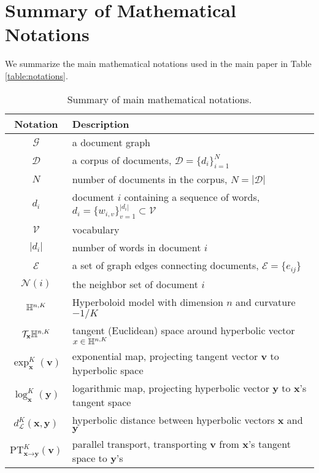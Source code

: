 \section{Summary of Mathematical Notations}
\label{sec:notations}

We summarize the main mathematical notations used in the main paper in Table \ref{table:notations}.

\begin{table*}[h]
	\centering
	\caption{Summary of main mathematical notations.}
		\begin{tabular}{c|l}
			\toprule
			Notation  & Description  \\
			\hline
            $ \mathcal{G} $ & a document graph \\
			$ \mathcal{D} $ & a corpus of documents, $ \mathcal{D}=\{d_i\}_{i=1}^{N} $ \\
			$ N $ & number of documents in the corpus, $ N=|\mathcal{D}| $ \\
			$ d_i $ & document $ i $ containing a sequence of words, $ d_i=\{w_{i,v}\}_{v=1}^{|d_i|}\subset\mathcal{V} $ \\
			$ \mathcal{V} $ & vocabulary \\
			$ |d_i| $ & number of words in document $ i $ \\
			$ \mathcal{E} $ & a set of graph edges connecting documents, $ \mathcal{E}=\{e_{ij}\} $ \\
			$ \mathcal{N}(i) $ & the neighbor set of document $ i $ \\
            $ \Bbb H^{n,K} $ & Hyperboloid model with dimension $ n $ and curvature $ -1/K $ \\
			$ \mathcal{T}_{\textbf{x}}\Bbb H^{n,K} $ & tangent (Euclidean) space around hyperbolic vector $ x\in\Bbb H^{n,K} $ \\
			$ \exp_{\textbf{x}}^K(\textbf{v}) $ & exponential map, projecting tangent vector $ \textbf{v} $ to hyperbolic space \\
			$ \log_{\textbf{x}}^K(\textbf{y}) $ & logarithmic map, projecting hyperbolic vector $ \textbf{y} $ to $ \textbf{x} $'s tangent space \\
			$ d_{\mathcal{L}}^K(\textbf{x},\textbf{y}) $ & hyperbolic distance between hyperbolic vectors $ \textbf{x} $ and $ \textbf{y} $ \\
			$ \text{PT}_{\textbf{x}\rightarrow\textbf{y}}^K(\textbf{v}) $ & parallel transport, transporting $ \textbf{v} $ from $ \textbf{x} $'s tangent space to $ \textbf{y} $'s \\

\end{tabular}
\end{table*}

